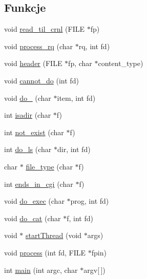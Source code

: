 \subsection*{Funkcje}
\begin{DoxyCompactItemize}
\item 
void \mbox{\hyperlink{10d-serwer_8c_aec3402ec3244a54e1bc086a1e1054755}{read\+\_\+til\+\_\+crnl}} (F\+I\+LE $\ast$fp)
\item 
void \mbox{\hyperlink{10d-serwer_8c_ad8ba6d5e4a00c2fff7a65af14096bd9b}{process\+\_\+rq}} (char $\ast$rq, int fd)
\item 
void \mbox{\hyperlink{10d-serwer_8c_adc7bfb1c892aecf61c0c73f3458caf90}{header}} (F\+I\+LE $\ast$fp, char $\ast$content\+\_\+type)
\item 
void \mbox{\hyperlink{10d-serwer_8c_a8e603d6f76a35b616135eb394f6ec080}{cannot\+\_\+do}} (int fd)
\item 
void \mbox{\hyperlink{10d-serwer_8c_ad3f91122750391e238cfbee3b88975ec}{do\+\_}} (char $\ast$item, int fd)
\item 
int \mbox{\hyperlink{10d-serwer_8c_a68ac50fc5196973b9f3ef7b4992f7279}{isadir}} (char $\ast$f)
\item 
int \mbox{\hyperlink{10d-serwer_8c_a963f754c08801de5f56c78f1b26e3a86}{not\+\_\+exist}} (char $\ast$f)
\item 
int \mbox{\hyperlink{10d-serwer_8c_a83999b0603c38aa5fe08f7ed801e6cfe}{do\+\_\+ls}} (char $\ast$dir, int fd)
\item 
char $\ast$ \mbox{\hyperlink{10d-serwer_8c_a29b9ee72561809560e62a9ea307d1ff6}{file\+\_\+type}} (char $\ast$f)
\item 
int \mbox{\hyperlink{10d-serwer_8c_ad3ef3c593d3a792b02a341450eaa62dd}{ends\+\_\+in\+\_\+cgi}} (char $\ast$f)
\item 
void \mbox{\hyperlink{10d-serwer_8c_a0a305ff573da158eaa9484e5506921c0}{do\+\_\+exec}} (char $\ast$prog, int fd)
\item 
void \mbox{\hyperlink{10d-serwer_8c_adab7e9f2617cceb5752ef3f97cfc2ef1}{do\+\_\+cat}} (char $\ast$f, int fd)
\item 
void $\ast$ \mbox{\hyperlink{10d-serwer_8c_aad3b04c93a07b2f8394c08d734abc062}{start\+Thread}} (void $\ast$args)
\item 
void \mbox{\hyperlink{10d-serwer_8c_a182f39efe710f6e9bf678baa9e8eafa3}{process}} (int fd, F\+I\+LE $\ast$fpin)
\item 
int \mbox{\hyperlink{10d-serwer_8c_a0ddf1224851353fc92bfbff6f499fa97}{main}} (int argc, char $\ast$argv\mbox{[}$\,$\mbox{]})
\end{DoxyCompactItemize}
